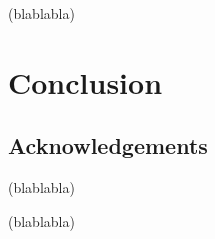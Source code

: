 \documentclass[11pt]{book}
\begin{document}
(blablabla)


\chapter*{Conclusion} \label{chp:conclusion}


\newpage
\vspace*{100pt}
\thispagestyle{empty}
\section*{Acknowledgements}

(blablabla)


(blablabla) 


\nocite{*}







\backmatter

\printindex

\end{document}
